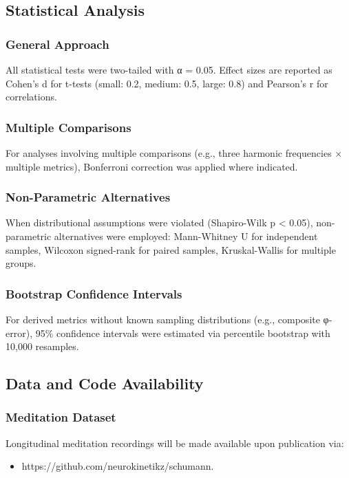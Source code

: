 \documentclass[11pt,a4paper]{article}
\begin{document}
\subsection{Statistical Analysis}

\subsubsection{General Approach}
All statistical tests were two-tailed with α = 0.05. Effect sizes are reported as Cohen's d for t-tests (small: 0.2, medium: 0.5, large: 0.8) and Pearson's r for correlations.

\subsubsection{Multiple Comparisons}
For analyses involving multiple comparisons (e.g., three harmonic frequencies × multiple metrics), Bonferroni correction was applied where indicated.

\subsubsection{Non-Parametric Alternatives}
When distributional assumptions were violated (Shapiro-Wilk p < 0.05), non-parametric alternatives were employed: Mann-Whitney U for independent samples, Wilcoxon signed-rank for paired samples, Kruskal-Wallis for multiple groups.

\subsubsection{Bootstrap Confidence Intervals}
For derived metrics without known sampling distributions (e.g., composite φ-error), 95\% confidence intervals were estimated via percentile bootstrap with 10,000 resamples.

\subsection{Data and Code Availability}

\subsubsection{Meditation Dataset}
Longitudinal meditation recordings will be made available upon publication via:
\begin{itemize}
    \item https://github.com/neurokinetikz/schumann.
\end{itemize}
\end{document}
